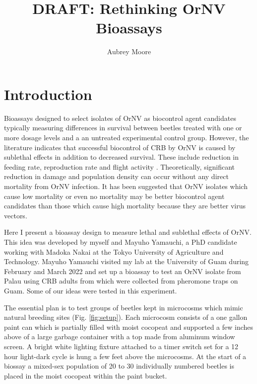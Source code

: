 \documentclass[twocolumn, 12pt,letterpaper,english,bibliography=totocnumbered, abstract=on]{scrartcl}
\begin{document}

\title{DRAFT: Rethinking OrNV Bioassays}

\author{Aubrey Moore}


\maketitle
\tableofcontents


\section{Introduction}

Bioassays designed to select isolates of OrNV as biocontrol agent candidates typically measuring differences in survival between beetles treated with one or more dosage levels and a an untreated experimental control group. However, the literature indicates that successful biocontrol of CRB by OrNV is caused by sublethal effects in addition to decreased survival. These include reduction in feeding rate, reproduction rate and flight activity \parencite{zelazny1977,prasad2008}. Theoretically, significant reduction in damage and population density can occur without any direct mortality from OrNV infection. It has been suggested that OrNV isolates which cause low mortality or even no mortality may be better biocontrol agent candidates than those which cause high mortality because they are better virus vectors.

Here I present a bioassay design to measure lethal and sublethal effects of OrNV. This idea was developed by myself and Mayuho Yamauchi, a PhD candidate working with Madoka Nakai at the Tokyo University of Agriculture and Technology. Mayuho Yamauchi visited my lab at the University of Guam during February and March 2022 and set up a bioassay to test an OrNV isolate from Palau using CRB adults from which were collected from pheromone traps on Guam. Some of our ideas were tested in this experiment.

The essential plan is to test groups of beetles kept in microcosms which mimic natural breeding sites (Fig. \ref{fig:setup}). Each microcosm consists of a one gallon paint can which is partially filled with moist cocopeat and supported a few inches above of a large garbage container with a top made from aluminum window screen. A bright white lighting fixture attached to a timer switch set for a 12 hour light-dark cycle is hung a few feet above the microcosms. At the start of a biossay a mixed-sex population of 20 to 30 individually numbered beetles is placed in the moist cocopeat within the paint bucket.  
\end{document}
